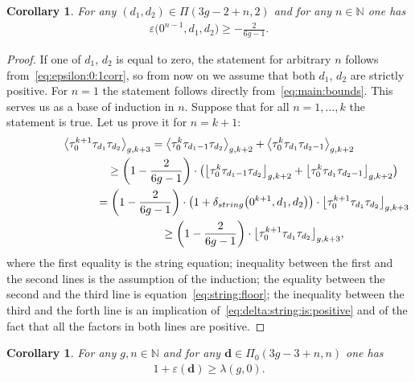 \documentclass[11pt]{article}
\renewcommand{\epsilon}{\varepsilon}
\newcommand\N{\mathbb N}
\newtheorem{Corollary}[Theorem]{Corollary}
\theoremstyle{definition}
\begin{document}
\begin{Corollary}\label{cor:epsilon:0:2corr}
For any $(d_1,d_2)\in\Pi(3g-2+n,2)$ and for any $n\in\N$
one has
\begin{gather}\label{eq:epsilon:0:2corr}
\epsilon\big(0^{n-1},d_1,d_2\big)\ge -\frac{2}{6g-1} .
\end{gather}
\end{Corollary}
\begin{proof}If one of $d_1$, $d_2$
is equal to zero, the statement for arbitrary $n$
follows from~\eqref{eq:epsilon:0:1corr}, so from now on
we assume
that both $d_1$, $d_2$ are strictly positive.
For $n=1$ the statement follows directly from~\eqref{eq:main:bounds}.
This serves us as a base of induction
in $n$. Suppose that for all $n=1,\dots,k$ the statement
is true. Let us prove it for $n=k+1$:
\begin{gather*}
\big\langle \tau_0^{k+1}\tau_{d_1}\tau_{d_2}\big\rangle_{g,k+3}
=\big\langle \tau_0^k\tau_{d_1-1}\tau_{d_2}\big\rangle_{g,k+2}
+\big\langle \tau_0^k\tau_{d_1}\tau_{d_2-1}\big\rangle_{g,k+2}\\
\hphantom{\big\langle \tau_0^{k+1}\tau_{d_1}\tau_{d_2}\big\rangle_{g,k+3}}{} \ge
\left(1-\frac{2}{6g-1}\right)\cdot
\big(\big\lfloor \tau_0^k\tau_{d_1-1}\tau_{d_2}\big\rfloor_{g,k+2}
+\big\lfloor \tau_0^k\tau_{d_1}\tau_{d_2-1}\big\rfloor_{g,k+2}
\big)\\
\hphantom{\big\langle \tau_0^{k+1}\tau_{d_1}\tau_{d_2}\big\rangle_{g,k+3}}{}
 =
\left(1-\frac{2}{6g-1}\right)
\cdot\big(1+\delta_{\rm string}\big(0^{k+1},d_1,d_2\big)\big)\cdot
\big\lfloor \tau_0^{k+1}\tau_{d_1}\tau_{d_2}\big\rfloor_{g,k+3}\\
\hphantom{\big\langle \tau_0^{k+1}\tau_{d_1}\tau_{d_2}\big\rangle_{g,k+3}}{} \ge
\left(1-\frac{2}{6g-1}\right)\cdot
\big\lfloor \tau_0^{k+1}\tau_{d_1}\tau_{d_2}\big\rfloor_{g,k+3} ,
\end{gather*}
where the first equality is the string equation;
inequality between the first and the second lines is
the assumption of the induction; the equality
between the second and the third line is
equation~\eqref{eq:string:floor}; the inequality
between the third and the forth line is
an implication of~\eqref{eq:delta:string:is:positive}
and of the fact that all the factors in both lines are
positive.
\end{proof}

\begin{Corollary}\label{cor:L:equals:0}
For any $g,n\in\N$ and for any
$\boldsymbol{d}\in\Pi_0(3g-3+n,n)$ one has
\begin{gather}\label{eq:epsilon:is:smaller:than:lambda:0}
1+\epsilon(\boldsymbol{d})\ge\lambda(g,0) .
\end{gather}
\end{Corollary}
\end{document}
